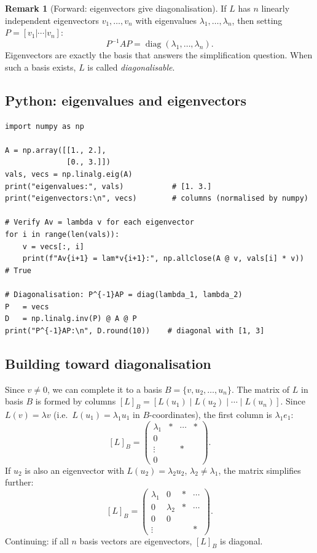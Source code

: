 \documentclass[11pt]{article}
\theoremstyle{definition}
\newtheorem{remark}{Remark}[section]
\theoremstyle{plain}
\begin{document}
\begin{remark}[Forward: eigenvectors give diagonalisation]
  If $L$ has $n$ linearly independent eigenvectors $v_1,\ldots,v_n$ with
  eigenvalues $\lambda_1,\ldots,\lambda_n$, then setting $P=[v_1|\cdots|v_n]$:
  \[
    P^{-1}AP = \operatorname{diag}(\lambda_1,\ldots,\lambda_n).
  \]
  Eigenvectors are exactly the basis that answers the simplification question.
  When such a basis exists, $L$ is called \emph{diagonalisable}.
\end{remark}

\subsection{Python: eigenvalues and eigenvectors}
\begin{lstlisting}
import numpy as np

A = np.array([[1., 2.],
              [0., 3.]])
vals, vecs = np.linalg.eig(A)
print("eigenvalues:", vals)           # [1. 3.]
print("eigenvectors:\n", vecs)        # columns (normalised by numpy)

# Verify Av = lambda v for each eigenvector
for i in range(len(vals)):
    v = vecs[:, i]
    print(f"Av{i+1} = lam*v{i+1}:", np.allclose(A @ v, vals[i] * v))  # True

# Diagonalisation: P^{-1}AP = diag(lambda_1, lambda_2)
P   = vecs
D   = np.linalg.inv(P) @ A @ P
print("P^{-1}AP:\n", D.round(10))    # diagonal with [1, 3]
\end{lstlisting}

\subsection{Building toward diagonalisation}

Since $v \neq 0$, we can complete it to a basis
$B = \{v, u_2, \ldots, u_n\}$.  The matrix of $L$ in basis $B$ is
formed by columns $[L]_B = [L(u_1) \mid L(u_2) \mid \cdots \mid L(u_n)]$.
Since $L(v) = \lambda v$ (i.e.\ $L(u_1) = \lambda_1 u_1$ in $B$-coordinates),
the first column is $\lambda_1 e_1$:
\[
  [L]_B =
  \begin{pmatrix}
    \lambda_1 & * & \cdots & * \\
    0         &   &        &   \\
    \vdots    &   & *      &   \\
    0         &   &        &
  \end{pmatrix}.
\]
If $u_2$ is also an eigenvector with $L(u_2) = \lambda_2 u_2$, $\lambda_2 \neq \lambda_1$,
the matrix simplifies further:
\[
  [L]_B =
  \begin{pmatrix}
    \lambda_1 & 0         & * & \cdots \\
    0         & \lambda_2 & * & \cdots \\
    0         & 0         &   &        \\
    \vdots    &           &   & *
  \end{pmatrix}.
\]
Continuing: if all $n$ basis vectors are eigenvectors, $[L]_B$ is diagonal.
\end{document}

